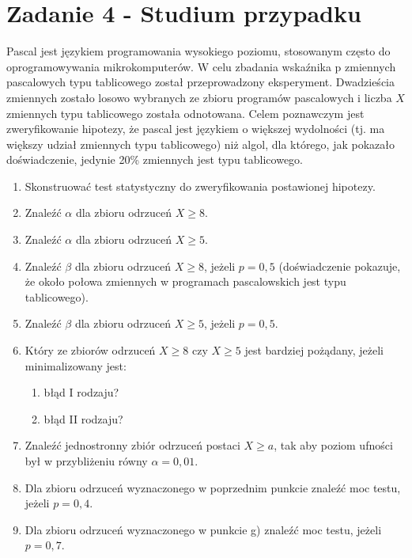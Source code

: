 \documentclass{article}
\begin{document}
\newpage
\section{Zadanie 4 - Studium przypadku}
Pascal jest językiem programowania wysokiego poziomu, stosowanym często do oprogramowywania mikrokomputerów. W celu zbadania wskaźnika p zmiennych pascalowych typu tablicowego został przeprowadzony eksperyment. Dwadzieścia zmiennych zostało losowo wybranych ze zbioru programów pascalowych i liczba $X$ zmiennych typu tablicowego została odnotowana. Celem poznawczym jest zweryfikowanie hipotezy, że pascal jest językiem o większej wydolności (tj. ma większy udział zmiennych typu tablicowego) niż algol, dla którego, jak pokazało doświadczenie, jedynie 20\% zmiennych jest typu tablicowego.
\begin{enumerate}[label = \alph*)]
\item Skonstruować test statystyczny do zweryfikowania postawionej hipotezy.
\item Znaleźć $\alpha$ dla zbioru odrzuceń $X\geq8$.
\item Znaleźć $\alpha$ dla zbioru odrzuceń $X\geq5$.
\item Znaleźć $\beta$ dla zbioru odrzuceń $X\geq8$, jeżeli $p=0,5$ (doświadczenie pokazuje, że około połowa zmiennych w programach pascalowskich jest typu tablicowego).
\item Znaleźć $\beta$ dla zbioru odrzuceń $X\geq5$, jeżeli $p=0,5$.
\item Który ze zbiorów odrzuceń $X\geq8$ czy $X\geq5$ jest bardziej pożądany, jeżeli minimalizowany jest:
	\begin{enumerate}[label = \Alph*)]
	\item błąd I rodzaju?
	\item błąd II rodzaju?
	\end{enumerate}
\item Znaleźć jednostronny zbiór odrzuceń postaci $X\geq a$, tak aby poziom ufności był w przybliżeniu równy $\alpha=0,01$.
\item Dla zbioru odrzuceń wyznaczonego w poprzednim punkcie znaleźć moc testu, jeżeli $p=0,4$.
\item Dla zbioru odrzuceń wyznaczonego w punkcie g) znaleźć moc testu, jeżeli $p=0,7$.
\end{enumerate}
\end{document}
